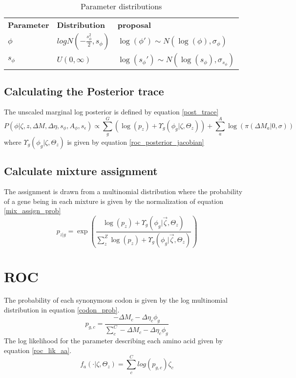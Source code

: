 \documentclass[11pt]{article}
\begin{document}
  
  \begin{table}[h]
    \centering
    \caption{Parameter distributions}
    \label{param_dist}
    \begin{tabular}{|l|l|l|}
      \cline{1-3}
      \textbf{Parameter} & \textbf{Distribution}				& \textbf{proposal}					\\ \cline{1-3}
      $\phi$		& $logN(-\frac{s_{\phi}^2}{2}, s_{\phi})$	& $\log(\phi') \sim N(\log(\phi), \sigma_{\phi})$		\\ \cline{1-3}
      $s_{\phi}$	& $U(0, \infty)$	& $\log(s_\phi') \sim N(\log(s_\phi), \sigma_{s_{\phi}})$		\\ \cline{1-3}

    \end{tabular}
  \end{table}
  
  \subsection{Calculating the Posterior trace}
  The unscaled marginal log posterior is defined by equation \ref{post_trace}
  \begin{equation}
    P(\phi | \zeta, z, \Delta M, \Delta \eta, s_{\phi}, A_{\phi}, s_{\epsilon}) \propto \sum_g^G \left(\log(p_z) + \Upsilon_g(\phi_g|\zeta, \Theta_z)\right) + \sum_a^A \log(\pi(\Delta M_a| 0, \sigma))
    \label{post_trace}
  \end{equation}
  where $\Upsilon_g(\phi_g|\zeta, \Theta_z)$ is given by equation \ref{roc_posterior_jacobian}
  
  \subsection{Calculate mixture assignment}
  The assignment is drawn from a multinomial distribution where the probability of a gene being in each mixture is given by the normalization of equation \ref{mix_assign_prob}
  \begin{equation}
    p_{z|g} = \exp \left(\frac{\log(p_z) + \Upsilon_g(\phi_g|\vec{\zeta}, \Theta_z)}{\sum_z^Z \log(p_z) + \Upsilon_g(\phi_g|\vec{\zeta}, \Theta_z)}\right)
    \label{mix_assign_prob}
  \end{equation}  

  \section{ROC}
  
  The probability of each synonymous codon is given by the log multinomial distribution in equation \ref{codon_prob}.
  \begin{equation}
    p_{g,c} = \frac{-\Delta M_c - \Delta\eta_c \phi_g}{\sum_c^C -\Delta M_c - \Delta\eta_c \phi_g}
    \label{codon_prob}
  \end{equation}
  The log likelihood for the parameter describing each amino acid given by equation \ref{roc_lik_aa}.
  \begin{equation}
    f_a(\cdot|\zeta, \Theta_z) = \sum_c^C log(p_{g,c}) \zeta_c
    \label{roc_lik_aa}
  \end{equation}
\end{document}
